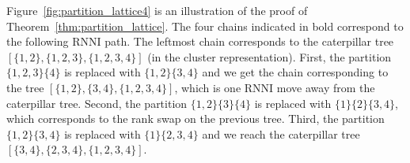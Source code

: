 \documentclass[11pt]{amsart}
\newcommand{\rnni}{\mathrm{RNNI}}
\begin{document}
Figure~\ref{fig:partition_lattice4} is an illustration of the proof of Theorem~\ref{thm:partition_lattice}.
The four chains indicated in bold correspond to the following $\rnni$ path.
The leftmost chain corresponds to the caterpillar tree $[\{1, 2\}, \{1, 2, 3\}, \{1, 2, 3, 4\}]$ (in the cluster representation).
First, the partition $\{1, 2, 3\} \{4\}$ is replaced with $\{1, 2\} \{3, 4\}$ and we get the chain corresponding to the tree $[\{1, 2\}, \{3, 4\}, \{1, 2, 3, 4\}]$, which is one $\rnni$ move away from the caterpillar tree.
Second, the partition $\{1, 2\} \{3\} \{4\}$ is replaced with $\{1\} \{2\} \{3, 4\}$, which corresponds to the rank swap on the previous tree.
Third, the partition $\{1, 2\} \{3, 4\}$ is replaced with $\{1\} \{2, 3, 4\}$ and we reach the caterpillar tree $[\{3,4\}, \{2, 3, 4\}, \{1, 2, 3, 4\}]$.
\end{document}
